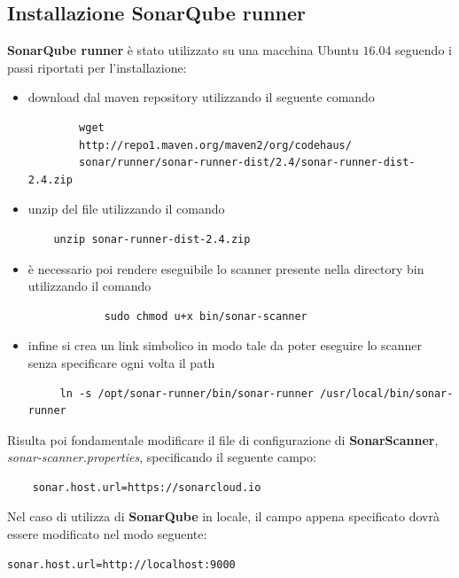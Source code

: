 \subsection{Installazione SonarQube runner}
\textbf{SonarQube runner} è stato utilizzato su una macchina Ubuntu $16.04$ seguendo i passi riportati per l'installazione:
\begin{itemize}
	\item download dal maven repository utilizzando il seguente comando 
	\begin{verbatim}
		wget 
		http://repo1.maven.org/maven2/org/codehaus/
		sonar/runner/sonar-runner-dist/2.4/sonar-runner-dist-2.4.zip
	\end{verbatim}	
	\item unzip del file utilizzando il comando
	\begin{verbatim}
	unzip sonar-runner-dist-2.4.zip
	\end{verbatim}
	\item è necessario poi rendere eseguibile lo scanner presente nella directory bin utilizzando il comando 
	\begin{verbatim}
			sudo chmod u+x bin/sonar-scanner
	\end{verbatim}
	\item infine si crea un link simbolico in modo tale da poter eseguire lo scanner senza specificare ogni volta il path
	\begin{verbatim}
	 ln -s /opt/sonar-runner/bin/sonar-runner /usr/local/bin/sonar-runner
	\end{verbatim}
\end{itemize}
Risulta poi fondamentale modificare il file di configurazione di \textbf{SonarScanner}, \textit{sonar-scanner.properties}, specificando il seguente campo:
\begin{verbatim}
	sonar.host.url=https://sonarcloud.io
\end{verbatim}
Nel caso di utilizza di \textbf{SonarQube} in locale, il campo appena specificato dovrà essere modificato nel modo seguente:
\begin{verbatim}
sonar.host.url=http://localhost:9000
\end{verbatim}


